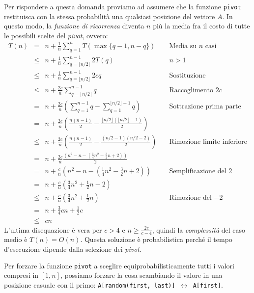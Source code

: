 Per rispondere a questa domanda proviamo ad assumere che la funzione
\texttt{pivot} restituisca con la stessa probabilità una qualsiasi posizione
del vettore $A$. In questo modo, la \emph{funzione di ricorrenza} diventa
$n$ più la media fra il costo di tutte le possibili scelte del \emph{pivot},
ovvero:
\[\begin{array}{rcll}
    T(n) & = & n+\frac{1}{n}\sum_{q=1}^n T(\max\{q-1,n-q\}) & \quad\text{Media su $n$ casi}\\
    & \leq & n+\frac{1}{n}\sum_{q=\lfloor n/2\rfloor}^{n-1}2T(q) & \quad n>1\\
    & \leq & n+\frac{1}{n}\sum_{q=\lfloor n/2\rfloor}^{n-1}2cq & \quad\text{Sostituzione}\\
    & \leq & n+\frac{2c}{n}\sum_{q=\lfloor n/2\rfloor}^{n-1}q & \quad\text{Raccoglimento $2c$}\\
    & = & n+\frac{2c}{n}\left(\sum_{q=1}^{n-1}q-\sum_{q=1}^{\lfloor n/2\rfloor-1}q\right) & \quad\text{Sottrazione prima parte}\\
    & = & n+\frac{2c}{n}\left(\frac{n(n-1)}{2}-\frac{\lfloor n/2\rfloor
    \left(\lfloor n/2\rfloor -1\right)}{2}\right)\\
    & \leq & n+\frac{2c}{n}\left(\frac{n(n-1)}{2}-\frac{\left(n/2-1\right)\left(n/2-2\right)}{2}
    \right) & \quad\text{Rimozione limite inferiore}\\
    & = & n+\frac{2c}{n}\frac{\left(n^2-n-\left(\frac{1}{4}n^2-\frac{3}{2}n+2\right)\right)}{2}\\
    & = & n+\frac{c}{n}\left(n^2-n-\left(\frac{1}{4}n^2-\frac{3}{2}n+2\right)\right) & \quad\text{Semplificazione del $2$}\\
    & = & n+\frac{c}{n}\left(\frac{3}{4}n^2+\frac{1}{2}n-2\right)\\
    & \leq & n+\frac{c}{n}\left(\frac{3}{4}n^2+\frac{1}{2}n\right) & \quad\text{Rimozione del $-2$}\\
    & = &n+\frac{3}{4}cn+\frac{1}{2}c\\
    & \leq & cn
\end{array}\]
L'ultima disequazione è vera per $c>4$ e $n\geq\frac{2c}{c-4}$, quindi la \emph{complessità}
del caso medio è $T(n)=O(n)$. Questa soluzione è probabilistica perché il tempo
d'esecuzione dipende dalla selezione dei \emph{pivot}.

\begin{note}
    Per forzare la funzione \texttt{pivot} a sceglire equiprobabilisticamente
    tutti i valori compresi in $[1,n]$, possiamo forzare la cosa scambiando il
    valore in una posizione casuale con il primo: \texttt{A[random(first, last)]
    $\leftrightarrow$ A[first]}\footnotemark.
\end{note}

